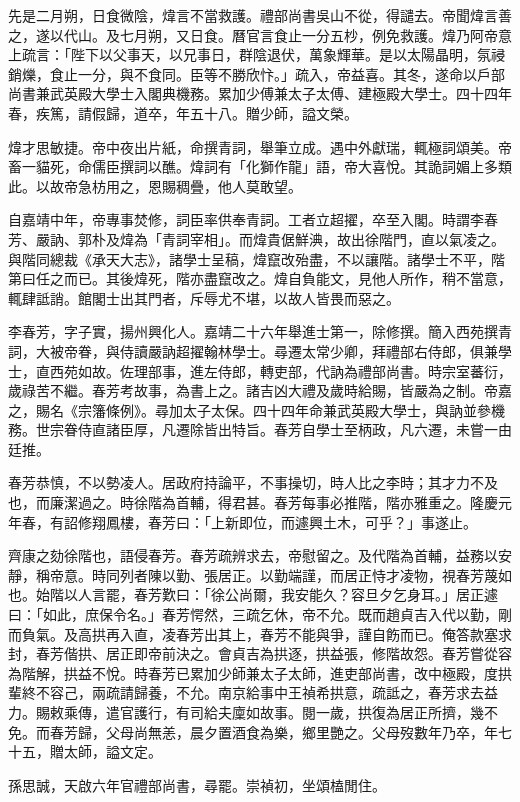 \begin{pinyinscope}
先是二月朔，日食微陰，煒言不當救護。禮部尚書吳山不從，得譴去。帝聞煒言善之，遂以代山。及七月朔，又日食。曆官言食止一分五杪，例免救護。煒乃阿帝意上疏言：「陛下以父事天，以兄事日，群陰退伏，萬象輝華。是以太陽晶明，氛祲銷爍，食止一分，與不食同。臣等不勝欣忭。」疏入，帝益喜。其冬，遂命以戶部尚書兼武英殿大學士入閣典機務。累加少傅兼太子太傅、建極殿大學士。四十四年春，疾篤，請假歸，道卒，年五十八。贈少師，謚文榮。

煒才思敏捷。帝中夜出片紙，命撰青詞，舉筆立成。遇中外獻瑞，輒極詞頌美。帝畜一貓死，命儒臣撰詞以醮。煒詞有「化獅作龍」語，帝大喜悅。其詭詞媚上多類此。以故帝急枋用之，恩賜稠疊，他人莫敢望。

自嘉靖中年，帝專事焚修，詞臣率供奉青詞。工者立超擢，卒至入閣。時謂李春芳、嚴訥、郭朴及煒為「青詞宰相」。而煒貴倨鮮淟，故出徐階門，直以氣凌之。與階同總裁《承天大志》，諸學士呈稿，煒竄改殆盡，不以讓階。諸學士不平，階第曰任之而已。其後煒死，階亦盡竄改之。煒自負能文，見他人所作，稍不當意，輒肆詆誚。館閣士出其門者，斥辱尤不堪，以故人皆畏而惡之。

李春芳，字子實，揚州興化人。嘉靖二十六年舉進士第一，除修撰。簡入西苑撰青詞，大被帝眷，與侍讀嚴訥超擢翰林學士。尋遷太常少卿，拜禮部右侍郎，俱兼學士，直西苑如故。佐理部事，進左侍郎，轉吏部，代訥為禮部尚書。時宗室蕃衍，歲祿苦不繼。春芳考故事，為書上之。諸吉凶大禮及歲時給賜，皆嚴為之制。帝嘉之，賜名《宗籓條例》。尋加太子太保。四十四年命兼武英殿大學士，與訥並參機務。世宗眷侍直諸臣厚，凡遷除皆出特旨。春芳自學士至柄政，凡六遷，未嘗一由廷推。

春芳恭慎，不以勢凌人。居政府持論平，不事操切，時人比之李時；其才力不及也，而廉潔過之。時徐階為首輔，得君甚。春芳每事必推階，階亦雅重之。隆慶元年春，有詔修翔鳳樓，春芳曰：「上新即位，而遽興土木，可乎？」事遂止。

齊康之劾徐階也，語侵春芳。春芳疏辨求去，帝慰留之。及代階為首輔，益務以安靜，稱帝意。時同列者陳以勤、張居正。以勤端謹，而居正恃才凌物，視春芳蔑如也。始階以人言罷，春芳歎曰：「徐公尚爾，我安能久？容旦夕乞身耳。」居正遽曰：「如此，庶保令名。」春芳愕然，三疏乞休，帝不允。既而趙貞吉入代以勤，剛而負氣。及高拱再入直，凌春芳出其上，春芳不能與爭，謹自飭而已。俺答款塞求封，春芳偕拱、居正即帝前決之。會貞吉為拱逐，拱益張，修階故怨。春芳嘗從容為階解，拱益不悅。時春芳已累加少師兼太子太師，進吏部尚書，改中極殿，度拱輩終不容己，兩疏請歸養，不允。南京給事中王禎希拱意，疏詆之，春芳求去益力。賜敕乘傳，遣官護行，有司給夫廩如故事。閱一歲，拱復為居正所擠，幾不免。而春芳歸，父母尚無恙，晨夕置酒食為樂，鄉里艷之。父母歿數年乃卒，年七十五，贈太師，謚文定。

孫思誠，天啟六年官禮部尚書，尋罷。崇禎初，坐頌榼閒住。


\end{pinyinscope}
